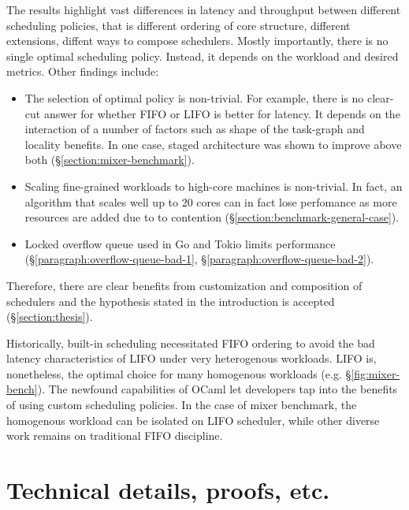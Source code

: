 \documentclass[12pt,a4paper,twoside]{report}
\begin{document}
The results highlight vast differences in latency and throughput between different scheduling policies, that is different ordering of core structure, different extensions, diffent ways to compose schedulers. Mostly importantly, there is no single optimal scheduling policy. Instead, it depends on the workload and desired metrics. Other findings include: 
\begin{itemize}
    \item The selection of optimal policy is non-trivial. For example, there is no clear-cut answer for whether FIFO or LIFO is better for latency. It depends on the interaction of a number of factors such as shape of the task-graph and locality benefits. In one case, staged architecture was shown to improve above both (\S\ref{section:mixer-benchmark}). 
    \item Scaling fine-grained workloads to high-core machines is non-trivial. In fact, an algorithm that scales well up to 20 cores can in fact lose perfomance as more resources are added due to to contention (\S\ref{section:benchmark-general-case}).
    \item Locked overflow queue used in Go and Tokio limits performance (\S\ref{paragraph:overflow-queue-bad-1}, \S\ref{paragraph:overflow-queue-bad-2}).
\end{itemize}
Therefore, there are clear benefits from customization and composition of schedulers and the hypothesis stated in the introduction is accepted (\S\ref{section:thesis}). 

Historically, built-in scheduling necessitated FIFO ordering to avoid the bad latency characteristics of LIFO under very heterogenous workloads. LIFO is, nonetheless, the optimal choice for many homogenous workloads (e.g. \S\ref{fig:mixer-bench}). The newfound capabilities of OCaml let developers tap into the benefits of using custom scheduling policies. In the case of mixer benchmark, the homogenous workload can be isolated on LIFO scheduler, while other diverse work remains on traditional FIFO discipline.


\label{lastcontentpage} %





\appendix


\chapter{Technical details, proofs, etc.}
\end{document}
